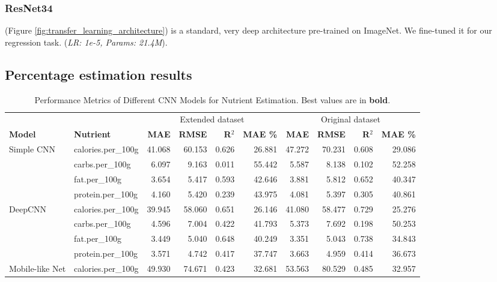 \documentclass[a4paper]{article}
\begin{document}
        \subsubsection{ResNet34}
        {
            (Figure \ref{fig:transfer_learning_architecture}) is a standard, very deep architecture pre-trained on ImageNet. We fine-tuned it for our regression task. (\textit{LR: 1e-5, Params: 21.4M}).
        }
        \subsection{Percentage estimation results}
        \begin{table}[hbt!]
\centering
\caption{Performance Metrics of Different CNN Models for Nutrient Estimation. Best values are in \textbf{bold}.}
\label{tab:combined_results_booktabs}
\small
\begin{tabular}{llrrrrrrrr}
\toprule
& & \multicolumn{4}{c}{Extended dataset} & \multicolumn{4}{c}{Original dataset} \\
\cmidrule(lr){3-6} \cmidrule(l){7-10}
\textbf{Model} & \textbf{Nutrient} & \textbf{MAE} & \textbf{RMSE} & \textbf{R$^2$} & \textbf{MAE \%} &\textbf{ MAE} & \textbf{RMSE} & \textbf{R$^2$} & \textbf{MAE \%} \\
\midrule
\multirow{4}{*}{Simple CNN} & calories.per\_100g & 41.068 & 60.153 & 0.626 & 26.881 & 47.272 & 70.231 & 0.608 & 29.086 \\
& carbs.per\_100g    & 6.097  & 9.163  & 0.011 & 55.442 & 5.587  & 8.138  & 0.102 & 52.258 \\
& fat.per\_100g      & 3.654  & 5.417  & 0.593 & 42.646 & 3.881  & 5.812  & 0.652 & 40.347 \\
& protein.per\_100g  & 4.160  & 5.420  & 0.239 & 43.975 & 4.081  & 5.397  & 0.305 & 40.861 \\
\midrule
\multirow{4}{*}{DeepCNN} & calories.per\_100g & 39.945 & 58.060 & 0.651 & 26.146 & 41.080 & 58.477 & 0.729 & 25.276 \\
& carbs.per\_100g    & 4.596  & 7.004  & 0.422 & 41.793 & 5.373  & 7.692  & 0.198 & 50.253 \\
& fat.per\_100g      & 3.449  & 5.040  & 0.648 & 40.249 & 3.351  & 5.043  & 0.738 & 34.843 \\
& protein.per\_100g  & 3.571  & 4.742  & 0.417 & 37.747 & 3.663  & 4.959  & 0.414 & 36.673 \\
\midrule
\multirow{4}{*}{Mobile-like Net} & calories.per\_100g & 49.930 & 74.671 & 0.423 & 32.681 & 53.563 & 80.529 & 0.485 & 32.957 \\

\end{tabular}
\end{table}
\end{document}
